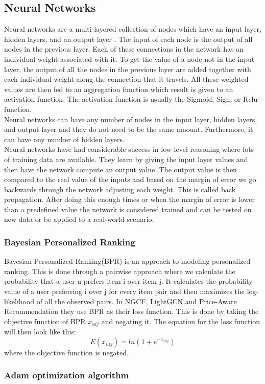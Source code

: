 \subsection{Neural Networks}
Neural networks are a multi-layered collection of nodes which have an input layer, hidden layers, and an output layer \cite{AI-book}.
The input of each node is the output of all nodes in the previous layer.
Each of these connections in the network has an individual weight associated with it.
To get the value of a node not in the input layer, the output of all the nodes in the previous layer are added together with each individual weight along the connection that it travels.
All these weighted values are then fed to an aggregation function which result is given to an activation function.
The activation function is usually the Sigmoid, Sign, or Relu function.
\\
Neural networks can have any number of nodes in the input layer, hidden layers, and output layer and they do not need to be the same amount.
Furthermore, it can have any number of hidden layers.
\\
Neural networks have had considerable success in low-level reasoning where lots of training data are available.
They learn by giving the input layer values and then have the network compute an output value.
The output value is then compared to the real value of the inputs and based on the margin of error we go backwards through the network adjusting each weight.
This is called back propagation.
After doing this enough times or when the margin of error is lower than a predefined value the network is considered trained and can be tested on new data or be applied to a real-world scenario.

\subsubsection{Bayesian Personalized Ranking}
Bayesian Personalized Ranking(BPR) is an approach to modeling personalized ranking.
This is done through a pairwise approach where we calculate the probability that a user u prefers item i over item j.
It calculates the probability value of a user preferring i over j for every item pair and then maximizes the log-likelihood of all the observed pairs.
In NGCF, LightGCN and Price-Aware Recommendation they use BPR as their loss function.
This is done by taking the objective function of BPR $x_{uij}$ and negating it.
The equation for the loss function will then look like this:
\[E(x_{uij}) = ln(1+e^{-x_{uij}})\]
where the objective function is negated.

\subsubsection{Adam optimization algorithm}
